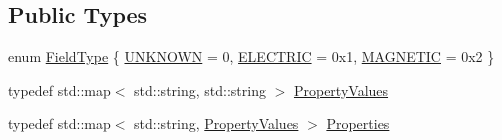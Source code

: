 \subsection*{Public Types}
\begin{DoxyCompactItemize}
\item 
enum \hyperlink{class_d_d4hep_1_1_geometry_1_1_cartesian_field_aa56ad95ffc11f27e7e793c9479680b78}{Field\+Type} \{ \hyperlink{class_d_d4hep_1_1_geometry_1_1_cartesian_field_aa56ad95ffc11f27e7e793c9479680b78a5a722f0da5938358899c908e35d4b1ab}{U\+N\+K\+N\+O\+WN} = 0, 
\hyperlink{class_d_d4hep_1_1_geometry_1_1_cartesian_field_aa56ad95ffc11f27e7e793c9479680b78afaf0fbca8e9d9556c784207943f88313}{E\+L\+E\+C\+T\+R\+IC} = 0x1, 
\hyperlink{class_d_d4hep_1_1_geometry_1_1_cartesian_field_aa56ad95ffc11f27e7e793c9479680b78a866e3d72a57ad60654afcedfa068e36b}{M\+A\+G\+N\+E\+T\+IC} = 0x2
 \}
\item 
typedef std\+::map$<$ std\+::string, std\+::string $>$ \hyperlink{class_d_d4hep_1_1_geometry_1_1_cartesian_field_a05dc63b1528e795f7d877d3fb236c394}{Property\+Values}
\item 
typedef std\+::map$<$ std\+::string, \hyperlink{class_d_d4hep_1_1_geometry_1_1_cartesian_field_a05dc63b1528e795f7d877d3fb236c394}{Property\+Values} $>$ \hyperlink{class_d_d4hep_1_1_geometry_1_1_cartesian_field_a37a636b9f5ee9ead172cca958dacb920}{Properties}
\end{DoxyCompactItemize}
